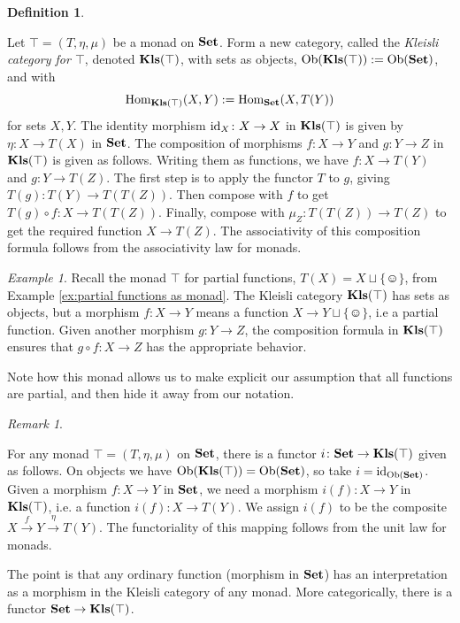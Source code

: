 \documentclass{book}
\def\tn{\textnormal}
\def\Hom{\tn{Hom}}
\def\Ob{\tn{Ob}}
\def\singleton{\{\smiley\}}
\def\to{\rightarrow}
\def\taking{\colon}
\newcommand{\To}[1]{\xrightarrow{#1}}
\def\id{\tn{id}}
\def\Kls{{\bf Kls}}
\def\Set{{\bf Set}}
\theoremstyle{remark}
\newtheorem{remark}[subsubsection]{Remark}
\newtheorem{example}[subsubsection]{Example}
\theoremstyle{definition}
\newtheorem{definition}[subsubsection]{Definition}
\begin{document}
\begin{definition}\label{def:kleisli}

Let $\top=(T,\eta,\mu)$ be a monad on $\Set$. Form a new category, called the {\em Kleisli category for $\top$}, denoted $\Kls(\top)$, with sets as objects, $\Ob(\Kls(\top)):=\Ob(\Set)$, and with $$\Hom_{\Kls(\top)}(X,Y):=\Hom_\Set(X,T(Y))$$ for sets $X,Y$. The identity morphism $\id_X\taking X\to X$ in $\Kls(\top)$ is given by $\eta\taking X\to T(X)$ in $\Set$. The composition of morphisms $f\taking X\to Y$ and $g\taking Y\to Z$ in $\Kls(\top)$ is given as follows. Writing them as functions, we have $f\taking X\to T(Y)$ and $g\taking Y\to T(Z)$. The first step is to apply the functor $T$ to $g$, giving $T(g)\taking T(Y)\to T(T(Z))$. Then compose with $f$ to get $T(g)\circ f\taking X\to T(T(Z))$. Finally, compose with $\mu_Z\taking T(T(Z))\to T(Z)$ to get the required function $X\to T(Z)$. The associativity of this composition formula follows from the associativity law for monads.

\end{definition}

\begin{example}

Recall the monad $\top$ for partial functions, $T(X)=X\sqcup\singleton$, from Example \ref{ex:partial functions as monad}. The Kleisli category $\Kls(\top)$ has sets as objects, but a morphism $f\taking X\to Y$ means a function $X\to Y\sqcup\singleton$, i.e a partial function. Given another morphism $g\taking Y\to Z$, the composition formula in $\Kls(\top)$ ensures that $g\circ f\taking X\to Z$ has the appropriate behavior.

Note how this monad allows us to make explicit our assumption that all functions are partial, and then hide it away from our notation.

\end{example}

\begin{remark}\label{rem:ordinary are kleisli}

For any monad $\top=(T,\eta,\mu)$ on $\Set$, there is a functor $i\taking \Set\to\Kls(\top)$ given as follows. On objects we have $\Ob(\Kls(\top))=\Ob(\Set)$, so take $i=\id_{\Ob(\Set)}$. Given a morphism $f\taking X\to Y$ in $\Set$, we need a morphism $i(f)\taking X\to Y$ in $\Kls(\top)$, i.e. a function $i(f)\taking X\to T(Y)$. We assign $i(f)$ to be the composite $X\To{f}Y\To{\eta}T(Y)$. The functoriality of this mapping follows from the unit law for monads.

The point is that any ordinary function (morphism in $\Set$) has an interpretation as a morphism in the Kleisli category of any monad. More categorically, there is a functor $\Set\to\Kls(\top)$.

\end{remark}
\end{document}

